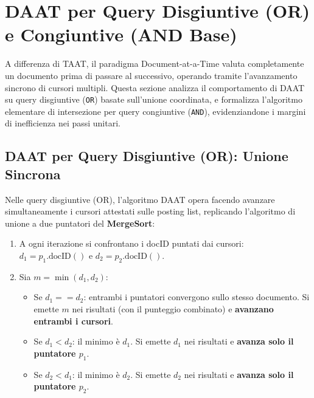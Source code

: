 \FloatBarrier
\section{DAAT per Query Disgiuntive (OR) e Congiuntive (AND Base)}
\label{sec:daat-or-and-base}

A differenza di TAAT, il paradigma Document-at-a-Time valuta completamente un documento prima di passare al successivo, operando tramite l'avanzamento sincrono di cursori multipli. Questa sezione analizza il comportamento di DAAT su query disgiuntive (\texttt{OR}) basate sull'unione coordinata, e formalizza l'algoritmo elementare di intersezione per query congiuntive (\texttt{AND}), evidenziandone i margini di inefficienza nei passi unitari.

\FloatBarrier
\subsection{DAAT per Query Disgiuntive (OR): Unione Sincrona}
\label{subsec:daat-or-unione}
Nelle query disgiuntive (OR), l'algoritmo DAAT opera facendo avanzare simultaneamente i cursori attestati sulle posting list, replicando l'algoritmo di unione a due puntatori del \textbf{MergeSort}:
\begin{enumerate}
    \item A ogni iterazione si confrontano i docID puntati dai cursori: $d_1 = p_1.\text{docID}()$ e $d_2 = p_2.\text{docID}()$.
    \item Sia $m = \min(d_1, d_2)$:
    \begin{itemize}
        \item Se $d_1 == d_2$: entrambi i puntatori convergono sullo stesso documento. Si emette $m$ nei risultati (con il punteggio combinato) e \textbf{avanzano entrambi i cursori}.
        \item Se $d_1 < d_2$: il minimo \`e $d_1$. Si emette $d_1$ nei risultati e \textbf{avanza solo il puntatore $p_1$}.
        \item Se $d_2 < d_1$: il minimo \`e $d_2$. Si emette $d_2$ nei risultati e \textbf{avanza solo il puntatore $p_2$}.
    \end{itemize}
\end{enumerate}

